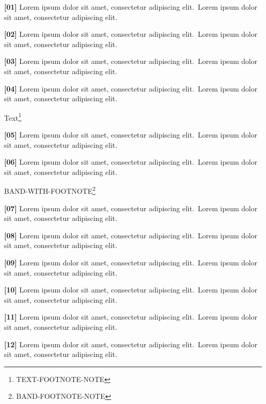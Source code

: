 \documentclass[twocolumn]{article}
\newcommand\Body{Lorem ipsum dolor sit amet, consectetur adipiscing elit.}
\newcommand\Par[1]{\par\textbf{[#1]} \Body\ \Body\par\medskip}
\begin{document}
\Par{01}\Par{02}\Par{03}\Par{04} Text\footnote{TEXT-FOOTNOTE-NOTE}\Par{05}\Par{06}
\begin{wideband}
  \centering BAND-WITH-FOOTNOTE\footnote{BAND-FOOTNOTE-NOTE}
\end{wideband}
\Par{07}\Par{08}\Par{09}\Par{10}\Par{11}\Par{12}
\end{document}
